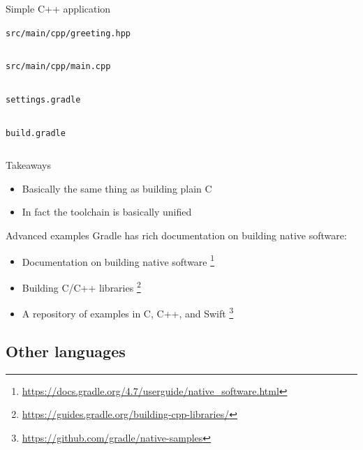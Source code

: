 \documentclass[presentation]{beamer}
\newcommand{\codefile}[4]{
	\begin{block}{\texttt{#2}}
		\inputminted[fontsize=#3,linenos=true,breaklines=true]{#4}{"workspace/#1/#2"}
	\end{block}
}
\newcommand{\ccode}[3]{\codefile{#1}{#2}{#3}{c}}
\newcommand{\groovy}[3]{\codefile{#1}{#2}{#3}{groovy}}
\begin{document}
\begin{frame}{Simple C++ application}
    \ccode{18-CPP}{src/main/cpp/greeting.hpp}{\normalsize}
    \ccode{18-CPP}{src/main/cpp/main.cpp}{\normalsize}
    \groovy{18-CPP}{settings.gradle}{\normalsize}
    \groovy{18-CPP}{build.gradle}{\normalsize}
    \begin{block}{Takeaways}
        \begin{itemize}
            \item Basically the same thing as building plain C
            \item In fact the toolchain is basically unified
        \end{itemize}
    \end{block}
\end{frame}

\begin{frame}[fragile]{Advanced examples}
    Gradle has rich documentation on building native software:
    \begin{itemize}
        \item Documentation on building native software \footnote{\url{https://docs.gradle.org/4.7/userguide/native_software.html}}
        \item Building C/C++ libraries \footnote{\url{https://guides.gradle.org/building-cpp-libraries/}}
        \item A repository of examples in C, C++, and Swift \footnote{\url{https://github.com/gradle/native-samples}}
    \end{itemize}
\end{frame}

\subsection{Other languages}
\end{document}
